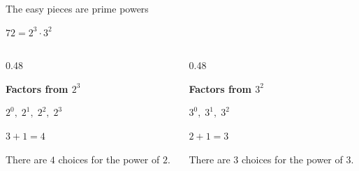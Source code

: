 \documentclass[aspectratio=169,11pt]{beamer}
\newcommand{\CardTitleSize}{\large}
\newcommand{\CardTitle}[1]{%
  \vspace{0.15cm}
  {\CardTitleSize\bfseries #1}\par
}
\begin{document}
\begin{frame}{The easy pieces are prime powers}

\begin{BlueBox}[
  calloutshadedblue,
  fontupper=\Large,
  halign=center
]{}
\(\displaystyle 72=2^3\cdot 3^2\)
\end{BlueBox}

\vspace{0.10cm}

\begin{columns}[T,totalwidth=\textwidth]

\begin{column}{0.48\textwidth}
\begin{GreenCard}[
  halign=center,
  top=10pt,
  bottom=10pt
]
\CardTitle{Factors from \(2^3\)}


\vspace{0.24cm}

{\Large
\(\displaystyle 2^0,\;2^1,\;2^2,\;2^3\)\par
}

\vspace{0.08cm}

{\Large
\(\displaystyle 3+1=4\)\par
}

\vspace{0.06cm}

{\normalsize
There are \(4\) choices for the power of \(2\).
}

\end{GreenCard}
\end{column}

\begin{column}{0.48\textwidth}
\begin{OrangeCard}[
  halign=center,
  top=10pt,
  bottom=10pt
]
\CardTitle{Factors from \(3^2\)}

\vspace{0.24cm}

{\Large
\(\displaystyle 3^0,\;3^1,\;3^2\)\par
}

\vspace{0.08cm}

{\Large
\(\displaystyle 2+1=3\)\par
}

\vspace{0.06cm}

{\normalsize
There are \(3\) choices for the power of \(3\).
}

\end{OrangeCard}
\end{column}

\end{columns}

\end{frame}
\end{document}

